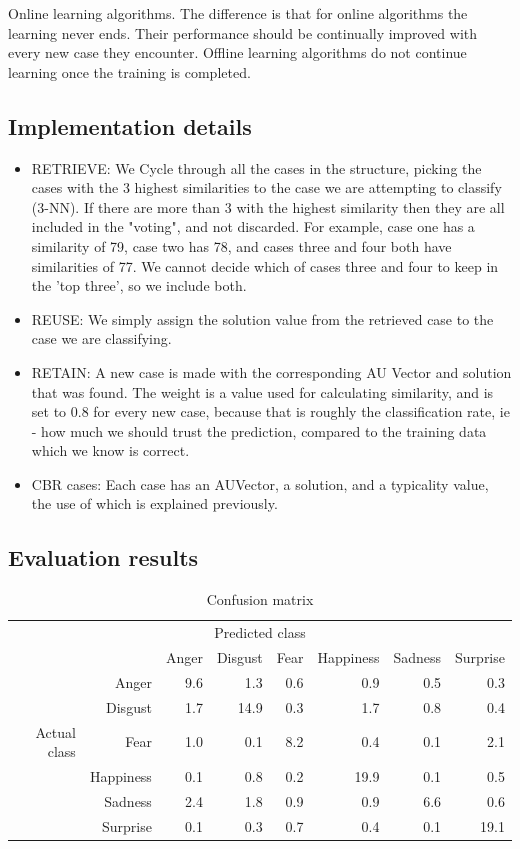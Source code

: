 \documentclass[12pt]{article}
\begin{document}
Online learning algorithms. The difference is that for online algorithms the learning never ends. Their performance should be continually improved with every new case they encounter. Offline learning algorithms do not continue learning once the training is completed.

\subsection*{Implementation details}
\begin{itemize}
  \item RETRIEVE:
    We Cycle through all the cases in the structure, picking the cases with the 3 highest similarities to the case we are attempting to classify (3-NN). If there are more than 3 with the highest similarity then they are all included in the "voting", and not discarded. For example, case one has a similarity of 79, case two has 78, and cases three and four both have similarities of 77. We cannot decide which of cases three and four to keep in the 'top three', so we include both.
  \item REUSE:
    We simply assign the solution value from the retrieved case to the case we are classifying.
  \item RETAIN:
    A new case is made with the corresponding AU Vector and solution that was found. The weight is a value used for calculating similarity, and is set to 0.8 for every new case, because that is roughly the classification rate, ie - how much we should trust the prediction, compared to the training data which we know is correct.
  \item CBR cases:
    Each case has an AUVector, a solution, and a typicality value, the use of which is explained previously.
\end{itemize}

\subsection*{Evaluation results}

\begin{table}
\centering
\begin{tabular}{r r | r r r r r r}
\multicolumn{8}{c}{Predicted class} \\
&  & Anger & Disgust & Fear & Happiness & Sadness & Surprise \\
\hline
 & Anger            & 9.6 & 1.3  & 0.6 & 0.9  & 0.5 & 0.3  \\
 & Disgust          & 1.7 & 14.9 & 0.3 & 1.7  & 0.8 & 0.4  \\
Actual class & Fear & 1.0 & 0.1  & 8.2 & 0.4  & 0.1 & 2.1  \\
 & Happiness        & 0.1 & 0.8  & 0.2 & 19.9 & 0.1 & 0.5  \\
 & Sadness          & 2.4 & 1.8  & 0.9 & 0.9  & 6.6 & 0.6  \\
 & Surprise         & 0.1 & 0.3  & 0.7 & 0.4  & 0.1 & 19.1 \\
\end{tabular} 
\caption{Confusion matrix}
\end{table}
\end{document}
